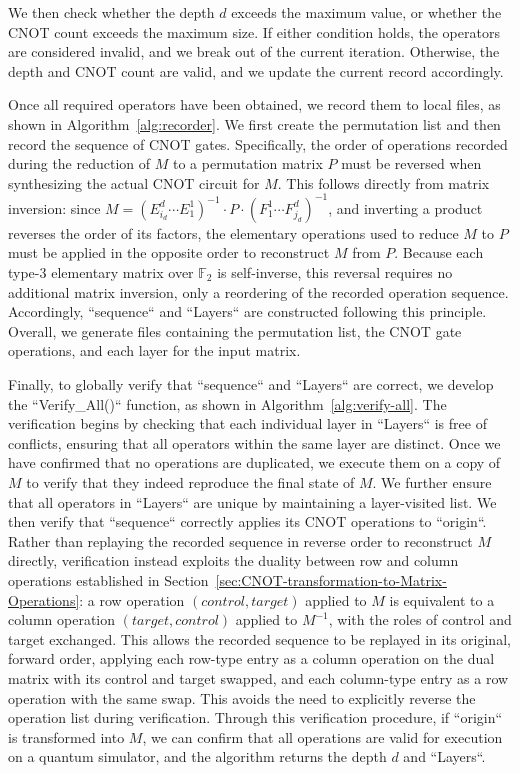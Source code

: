 We then check whether the depth $d$ exceeds the maximum value, or whether 
the CNOT count exceeds the maximum size. If either condition holds, the 
operators are considered invalid, and we break out of the current 
iteration. Otherwise, the depth and CNOT count are valid, and we update 
the current record accordingly.

Once all required operators have been obtained, we record them to local 
files, as shown in Algorithm~\ref{alg:recorder}. We first create the 
permutation list and then record the sequence of CNOT gates. Specifically, 
the order of operations recorded during the reduction of $M$ to a 
permutation matrix $P$ must be reversed when synthesizing the actual CNOT 
circuit for $M$. This follows directly from matrix inversion: since 
$M = (E^d_{i_d}\cdots E^1_1)^{-1} \cdot P \cdot (F^1_1\cdots F^d_{j_d})^{-1}$, 
and inverting a product reverses the order of its factors, the elementary 
operations used to reduce $M$ to $P$ must be applied in the opposite order 
to reconstruct $M$ from $P$. Because each type-3 elementary matrix over 
$\mathbb{F}_2$ is self-inverse, this reversal requires no additional matrix 
inversion, only a reordering of the recorded operation sequence. Accordingly, 
``sequence`` and ``Layers`` are constructed following this 
principle. Overall, we generate files containing the permutation list, the 
CNOT gate operations, and each layer for the input matrix.

Finally, to globally verify that ``sequence`` and ``Layers`` are 
correct, we develop the ``Verify\_All()`` function, as shown in 
Algorithm~\ref{alg:verify-all}. The verification begins by checking that 
each individual layer in ``Layers`` is free of conflicts, ensuring 
that all operators within the same layer are distinct. Once we have 
confirmed that no operations are duplicated, we execute them on a copy of 
$M$ to verify that they indeed reproduce the final state of $M$. We further 
ensure that all operators in ``Layers`` are unique by maintaining a 
layer-visited list. We then verify that ``sequence`` correctly applies 
its CNOT operations to ``origin``. Rather than replaying the recorded 
sequence in reverse order to reconstruct $M$ directly, verification instead 
exploits the duality between row and column operations established in 
Section~\ref{sec:CNOT-transformation-to-Matrix-Operations}: a row operation 
$(control, target)$ applied to $M$ is equivalent to a column operation 
$(target, control)$ applied to $M^{-1}$, with the roles of control and 
target exchanged. This allows the recorded sequence to be replayed in its 
original, forward order, applying each row-type entry as a column operation 
on the dual matrix with its control and target swapped, and each 
column-type entry as a row operation with the same swap. This avoids the 
need to explicitly reverse the operation list during verification. Through 
this verification procedure, if ``origin`` is transformed into $M$, 
we can confirm that all operations are valid for execution on a quantum 
simulator, and the algorithm returns the depth $d$ and ``Layers``.

